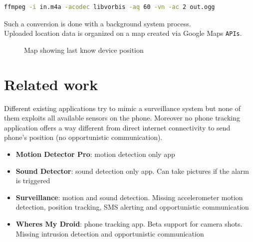 \documentclass[conference, 11pt]{IEEEtran}
\begin{document}
\begin{lstlisting}[language=Bash, caption=FFMPEG command to convert aac to mp3]
ffmpeg -i in.m4a -acodec libvorbis -aq 60 -vn -ac 2 out.ogg
\end{lstlisting}

Such a conversion is done with a background system process.\\

Uploaded location data is organized on a map created via Google Maps \texttt{APIs}.

\begin{figure}[!ht]
\begin{center}
\caption{Map showing last know device position}
\label{img:slideshow}
\end{center}
\end{figure}

\section{\textbf{Related work}}
Different existing applications try to mimic a surveillance system but none of them exploits all available sensors on the phone. Moreover no phone tracking application offers a way different from direct internet connectivity to send phone's position (no opportunistic communication).\\

\begin{itemize}
	\item \textbf{Motion Detector Pro}: motion detection only app
	\item \textbf{Sound Detector}: sound detection only app. Can take pictures if the alarm is triggered
	\item \textbf{Surveillance}: motion and sound detection. Missing accelerometer motion detection, position tracking, SMS alerting and opportunistic communication
	\item \textbf{Wheres My Droid}: phone tracking app. Beta support for camera shots. Missing intrusion detection and opportunistic communication

\end{itemize}
\end{document}
